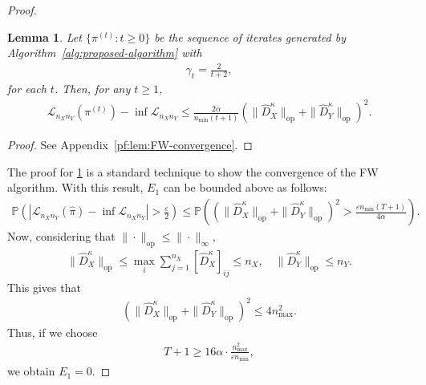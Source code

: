 \documentclass{article}
\newtheorem{lemma}{Lemma}
\begin{document}
\begin{proof}
	\begin{lemma}
		\label{lem:FW-convergence}
		Let $\{\pi^{(t)}: t \geq 0\}$ be the sequence of iterates generated by Algorithm~\ref{alg:proposed-algorithm} with
		\begin{align*}
			\gamma_t = \frac{2}{t+2} ,
		\end{align*}
		for each $t$. Then, for any $t \geq 1$,
		\begin{align*}
			\mathcal{L}_{n_Xn_Y}(\pi^{(t)}) - \inf\mathcal{L}_{n_Xn_Y} \leq \frac{2\alpha}{n_{\min}(t+1)} \left(\|\hat{D}_X^\kappa\|_{\mathrm{op}} + \|\hat{D}_Y^\kappa\|_{\mathrm{op}}\right)^2 .
		\end{align*}
	\end{lemma}
	\begin{proof}
		See Appendix~\ref{pf:lem:FW-convergence}.
	\end{proof}
	
	The proof for \cref{lem:FW-convergence} is a standard technique to show the convergence of the FW algorithm. With this result, $E_1$ can be bounded above as follows:
	\begin{align*}
		\mathbb{P}\left(\left\vert \mathcal{L}_{n_Xn_Y}(\hat{\pi}) - \inf \mathcal{L}_{n_Xn_Y} \right\vert > \frac{\varepsilon}{2}\right) \leq \mathbb{P}\left(\left(\|\hat{D}_X^\kappa\|_{\mathrm{op}} + \|\hat{D}_Y^\kappa\|_{\mathrm{op}}\right)^2 > \frac{\varepsilon n_{\min}(T+1)}{4\alpha}\right) .
	\end{align*}
	Now, considering that $\|\cdot\|_{\mathrm{op}} \leq \|\cdot\|_{\infty}$,
	\begin{align*}
		\|\hat{D}_X^\kappa\|_{\mathrm{op}} \leq \max_{i} \sum_{j=1}^{n_X} [\hat{D}_X^\kappa]_{ij} \leq n_X , \quad \|\hat{D}_Y^\kappa\|_{\mathrm{op}} \leq n_Y .
	\end{align*}
	This gives that
	\begin{align*}
		\left(\|\hat{D}_X^\kappa\|_{\mathrm{op}} + \|\hat{D}_Y^\kappa\|_{\mathrm{op}}\right)^2 \leq 4n_{\max}^2 .
	\end{align*}
	Thus, if we choose
	\begin{align*}
		T + 1 \geq 16\alpha \cdot \frac{n_{\max}^2}{\varepsilon n_{\min}} ,
	\end{align*}
	we obtain $E_1 = 0$.
	

\end{proof}
\end{document}
